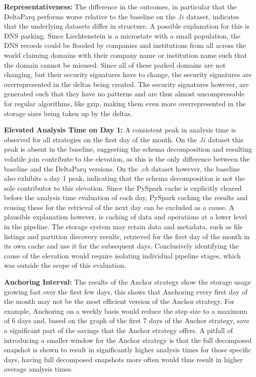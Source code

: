 \hspace{\parindent}\textbf{Representativeness:} The difference in the outcomes, in particular that the DeltaParq performs worse relative to the baseline on the $.li$ dataset, indicates that 
the underlying datasets differ in structure. A possible explanation for this is DNS parking. Since Liechtenstein is a microstate with a small 
population, the DNS records could be flooded by companies and institutions from all across the world claiming domains with their company name 
or institution name such that the domain cannot be misused. Since all of these parked domains are not changing, but their security signatures 
have to change, the security signatures are overrepresented in the deltas being created. The security signatures however, are generated such 
that they have no patterns and are thus almost uncompressable for regular algorithms, like gzip, making them even more overrepresented in the 
storage sizes being taken up by the deltas.

\textbf{Elevated Analysis Time on Day 1:} A consistent peak in analysis time is observed for all strategies on the first day of the month. 
On the $.li$ dataset this peak is absent in the baseline, suggesting the schema decomposition and resulting volatile join contribute to the 
elevation, as this is the only difference between the baseline and the DeltaParq versions. On the $.ch$ dataset however, 
the baseline also exhibits a day 1 peak, indicating that the schema decomposition is not the sole contributor to this elevation.
Since the PySpark cache is explicitly cleared before the analysis time evaluation of each day, PySpark caching the results and reusing these 
for the retrieval of the next day can be excluded as a cause. A plausible explanation however, is caching of data and operations at a lower level 
in the pipeline. The storage system may retain data and metadata, such as file listings and partition discovery results, retrieved for the first day 
of the month in its own cache and use it for the subsequent days. Conclusively identifying the cause of the elevation would require isolating 
individual pipeline stages, which was outside the scope of this evaluation.

\textbf{Anchoring Interval:}\label{sec:discussion} The results of the Anchor strategy show the storage usage growing fast over the first few days, this shows that Anchoring every first day 
of the month may not be the most efficient version of the Anchor strategy. For example, Anchoring on a weekly basis would reduce the 
step size to a maximum of 6 days and, based on the graph of the first 7 days of the Anchor strategy, save a significant part of the savings 
that the Anchor strategy offers. A pitfall of introducing a smaller window for the Anchor strategy is that the full decomposed snapshot is 
shown to result in significantly higher analysis times for those specific days, having full decomposed snapshots more often would thus 
result in higher average analysis times.

